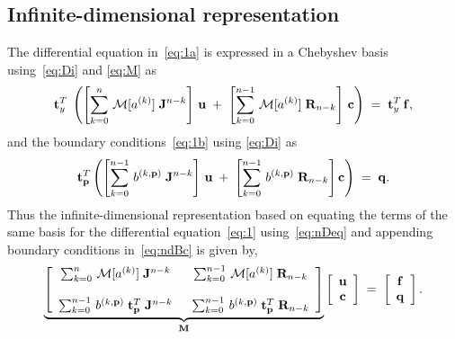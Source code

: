 \documentclass[%
secnumarabic,%
 amssymb, amsmath,%
 aps,prf,superscriptaddress,longbibliography
frontmatterverbose,
]{revtex4-2}
\begin{document}
\subsection{Infinite-dimensional representation}
The differential equation in~\eqref{eq:1a} is expressed in a Chebyshev basis using~\eqref{eq:Di} and \eqref{eq:M} as 
\begin{equation}\label{eq:nDeq}
  \mathbf{t}_{y}^T\;\left(\left[\sum_{k = 0}^{n}\, \mathcal M [a^{(k)}]\; \mathbf J^{n-k}\right]\,\mathbf{u} \;+\;   \left[\sum_{k = 0}^{n - 1}\, \mathcal M [a^{(k)}]\;\mathbf R_{n-k}\right]\,\mathbf{c}\right) \;=\; \mathbf{t}_{y}^T\,\mathbf{f},
\end{equation}
and the boundary conditions~\eqref{eq:1b} using \eqref{eq:Di} as
\begin{equation}\label{eq:ndBc}
  \mathbf{t}_{\mathbf{p}}^T\left(\left[\sum_{k = 0}^{n-1}\,b^{(k,\mathbf p)}\; \mathbf J^{n-k}\right]\,\mathbf{u} \;+\;\left[\sum_{k = 0}^{n-1}\, b^{(k,\mathbf p)}\;\mathbf R_{n-k}\right]\mathbf{c}\right)\;=\;\mathbf{q}.
\end{equation}
Thus the infinite-dimensional representation based on equating the terms of the same basis for the differential equation~\eqref{eq:1} using~\eqref{eq:nDeq} and appending boundary conditions in~\eqref{eq:ndBc} is given by,
\begin{equation}\label{eq:infiniteDim}
  \underbrace{\left[
  \begin{array}{cc}
    \sum_{k = 0}^{n}\, \mathcal M [a^{(k)}]\; \mathbf J^{n-k} \;&\; \sum_{k = 0}^{n - 1}\, \mathcal M [a^{(k)}]\;\mathbf R_{n-k}\\ \\
    \sum_{k = 0}^{n-1}\,b^{(k,\mathbf p)}\;\mathbf t^T_{ \mathbf p}\; \mathbf J^{n-k} \;&\; \sum_{k = 0}^{n-1}\, b^{(k,\mathbf p)}\;\mathbf t^T_{\mathbf p}\; \mathbf R_{n-k}
  \end{array}\right]}_{\mathbf{M}}\left[\begin{array}{c}
    \mathbf{u}\\
    \mathbf c
  \end{array}\right] \;=\; \left[\begin{array}{c}
    \mathbf{f}\\
    \mathbf q
  \end{array}\right].
\end{equation} 
\end{document}
